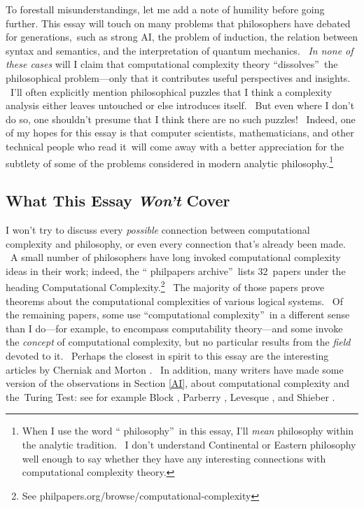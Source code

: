 \documentclass[11pt,onecolumn]{article}%
\begin{document}
To forestall misunderstandings, let me add a note of humility before going
further. This essay will touch on many problems that philosophers have debated
for generations,\ such as strong AI, the problem of induction, the relation
between syntax and semantics, and the interpretation of quantum mechanics.
\ \textit{In none of these cases} will I claim that computational complexity
theory \textquotedblleft dissolves\textquotedblright\ the philosophical
problem---only that it contributes useful perspectives and insights. \ I'll
often explicitly mention philosophical puzzles that I think a complexity
analysis either leaves untouched or else introduces itself. \ But even where I
don't do so, one shouldn't presume that I think there are no such puzzles!
\ Indeed, one of my hopes for this essay is that computer scientists,
mathematicians, and other technical people who read it\ will come away with a
better appreciation for the subtlety of some of the problems considered in
modern analytic philosophy.\footnote{When I use the word \textquotedblleft
philosophy\textquotedblright\ in this essay, I'll \textit{mean} philosophy
within the analytic tradition. \ I don't understand Continental or Eastern
philosophy well enough to say whether they have any interesting connections
with computational complexity theory.}

\subsection{What This Essay \textit{Won't} Cover\label{WONT}}

I won't try to discuss every \textit{possible} connection between
computational complexity and philosophy, or even every connection that's
already been made. \ A small number of philosophers have long invoked
computational complexity ideas in their work; indeed, the \textquotedblleft
philpapers archive\textquotedblright\ lists $32$\ papers under the heading
Computational Complexity.\footnote{See
philpapers.org/browse/computational-complexity} \ The majority of those papers
prove theorems about the computational complexities of various logical
systems. \ Of the remaining papers, some use \textquotedblleft computational
complexity\textquotedblright\ in a different sense than I do---for example, to
encompass computability theory---and some invoke the \textit{concept} of
computational complexity, but no particular results from the \textit{field}
devoted to it. \ Perhaps the closest in spirit to this essay are the
interesting articles by Cherniak \cite{cherniak} and Morton \cite{morton}.
\ In addition, many writers have made some version of the observations in
Section \ref{AI}, about computational complexity and the\ Turing Test: see for
example Block \cite{block}, Parberry \cite{parberry}, Levesque \cite{levesque}%
, and Shieber \cite{shieber}.
\end{document}
